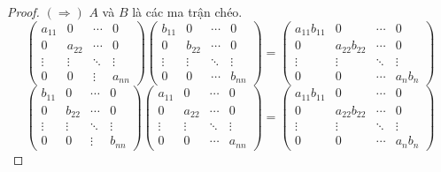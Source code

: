\begin{proof}
    $(\Rightarrow)$ $A$ và $B$ là các ma trận chéo.
    \[
        \begin{pmatrix}
            a_{11} & 0      & \cdots & 0      \\
            0      & a_{22} & \cdots & 0      \\
            \vdots & \vdots & \ddots & \vdots \\
            0      & 0      & \vdots & a_{nn}
        \end{pmatrix}
        \begin{pmatrix}
            b_{11} & 0      & \cdots & 0      \\
            0      & b_{22} & \cdots & 0      \\
            \vdots & \vdots & \ddots & \vdots \\
            0      & 0      & \cdots & b_{nn}
        \end{pmatrix}
        =
        \begin{pmatrix}
            a_{11}b_{11} & 0            & \cdots & 0          \\
            0            & a_{22}b_{22} & \cdots & 0          \\
            \vdots       & \vdots       & \ddots & \vdots     \\
            0            & 0            & \cdots & a_{n}b_{n}
        \end{pmatrix}
    \]
    \[
        \begin{pmatrix}
            b_{11} & 0      & \cdots & 0      \\
            0      & b_{22} & \cdots & 0      \\
            \vdots & \vdots & \ddots & \vdots \\
            0      & 0      & \vdots & b_{nn}
        \end{pmatrix}
        \begin{pmatrix}
            a_{11} & 0      & \cdots & 0      \\
            0      & a_{22} & \cdots & 0      \\
            \vdots & \vdots & \ddots & \vdots \\
            0      & 0      & \cdots & a_{nn}
        \end{pmatrix}
        =
        \begin{pmatrix}
            a_{11}b_{11} & 0            & \cdots & 0          \\
            0            & a_{22}b_{22} & \cdots & 0          \\
            \vdots       & \vdots       & \ddots & \vdots     \\
            0            & 0            & \cdots & a_{n}b_{n}
        \end{pmatrix}
    \]
    

\end{proof}
